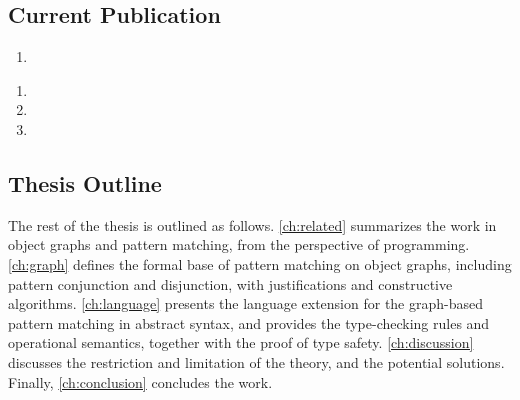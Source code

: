\subsection{Current Publication}\label{sec:publication}

\begin{BlindRegion}

\begin{enumerate}[label=(C\arabic*)]
  \item {}
\end{enumerate}

\begin{enumerate}[label=(J\arabic*)]
  \item {}
  \item {}
  \item {}
\end{enumerate}

\end{BlindRegion}

\subsection{Thesis Outline}

The rest of the thesis is outlined as follows.
\autoref{ch:related} summarizes the work in object graphs and pattern matching, from the perspective of {\OO} programming.
\autoref{ch:graph} defines the formal base of pattern matching on object graphs, including pattern conjunction and disjunction,
with justifications and constructive algorithms.
\autoref{ch:language} presents the language extension for the graph-based pattern matching in abstract syntax,
and provides the type-checking rules and operational semantics, together with the proof of type safety.
\autoref{ch:discussion} discusses the restriction and limitation of the theory, and the potential solutions.
Finally, \autoref{ch:conclusion} concludes the work.

\endinput